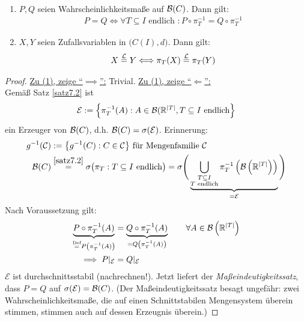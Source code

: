 \begin{satz}\label{satz7.5}\
\begin{enumerate}[label=(\arabic*)]
\item $P,Q$ seien Wahrscheinlichkeitsmaße auf $\mathcal{B}(C)$. Dann gilt:
\begin{align*}
P=Q\Longleftrightarrow\forall T\subseteq I\text{ endlich }: P\circ\pi_T^{-1}=Q\circ\pi_T^{-1}
\end{align*}
\item $X,Y$ seien Zufallsvariablen in $\big(C(I),d\big)$. Dann gilt:
\begin{align*}
X\stackrel{\mathcal{L}}{=}Y\Longleftrightarrow \pi_T(X)\stackrel{\mathcal{L}}{=}\pi_T(Y)
\end{align*}
\end{enumerate}
\end{satz}
\begin{proof}
\underline{Zu (1), zeige ``$\implies$'':} Trivial.\nl
\underline{Zu (1), zeige ``$\Longleftarrow$'':}\\
Gemäß Satz \ref{satz7.2} ist
\begin{align*}
\mathcal{E}:=\left\lbrace\pi_T^{-1}(A):A\in\mathcal{B}(\mathbb{R}^{|T|},T\subseteq I\text{ endlich}\right\rbrace
\end{align*}
ein Erzeuger von $\mathcal{B}(C)$, d.h. $\mathcal{B}(C)=\sigma(\mathcal{E})$. Erinnerung:
\begin{align*}
g^{-1}(\mathcal{C})&:=\big\lbrace g^{-1}(C):C\in\mathcal{C}\big\rbrace\text{ für Mengenfamilie }\mathcal{C}\\
\mathcal{B}(C)&\stackrel{\ref{satz7.2}}{=}\sigma\big(\pi_T:T\subseteq I\text{ endlich}\big)
=\sigma\Bigg(\underbrace{\bigcup\limits_{\begin{subarray}{c}T\subseteq I\\T\text{ endlich}\end{subarray}}\pi_T^{-1}\left(\mathcal{B}\left(\mathbb{R}^{|T|}\right)\right)}_{=\mathcal{E}}\Bigg)
\end{align*}
Nach Voraussetzung gilt:
\begin{align*}
\underbrace{P\circ\pi_T^{-1}(A)}_{\stackrel{\text{Def}}{=}P\left(\pi_T^{-1}(A)\right)}&=\underbrace{Q\circ\pi_T^{-1}(A)}_{=Q\left(\pi_T^{-1}(A)\right)}\qquad\forall A\in\mathcal{B}\left(\mathbb{R}^{|T|}\right)\\
\implies
P|_\mathcal{E}&=Q|_\mathcal{E}
\end{align*}
$\mathcal{E}$ ist durchschnittsstabil (nachrechnen!). Jetzt liefert der \textit{Maßeindeutigkeitssatz}, dass $P=Q$ auf $\sigma(\mathcal{E})=\mathcal{B}(C)$.
(Der Maßeindeutigkeitssatz besagt ungefähr: zwei Wahrscheinlichkeitsmaße, die auf einen Schnittstabilen Mengensystem überein stimmen, stimmen auch auf dessen Erzeugnis überein.)\nl

\end{proof}
